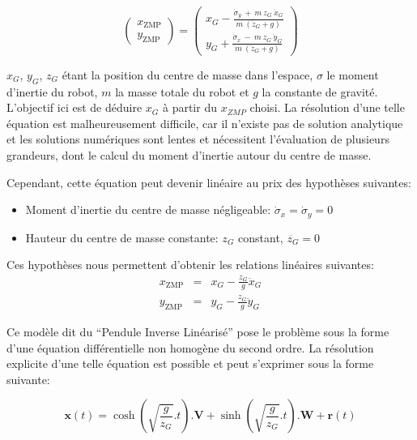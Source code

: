 \begin{equation}
\left(
\begin{array}{cc}
x_{\text{ZMP}}\\
y_{\text{ZMP}}
\end{array}
\right) = \left(
\begin{array}{cc}
x_G - \frac{\dot{\sigma}_y\ +\ m\ z_G\ \ddot{x}_G}{m\ (\ddot{z}_G + g)}\\
y_G + \frac{\dot{\sigma}_x\ -\ m\ z_G\ \ddot{y}_G}{m\ (\ddot{z}_G + g)}
\end{array}
\right)
\end{equation}

$x_G$, $y_G$, $z_G$ étant la position du centre de masse dans
l'espace, $\sigma$ le moment d'inertie du robot, $m$ la
masse totale du robot et $g$ la constante de gravité. L'objectif ici
est de déduire $x_{G}$ à partir du $x_{ZMP}$ choisi. La résolution
d'une telle équation est malheureusement difficile, car il n'existe
pas de solution analytique et les solutions numériques sont lentes et
nécessitent l'évaluation de plusieurs grandeurs, dont le calcul du
moment d'inertie autour du centre de masse.

Cependant, cette équation peut devenir linéaire au prix des hypothèses
suivantes:
\begin{itemize}
\item Moment d'inertie du centre de masse négligeable: $\dot{\sigma}_x = \dot{\sigma}_y = 0$
\item Hauteur du centre de masse constante: $z_G$ constant, $\ddot{z_G} = 0$
\end{itemize}

Ces hypothèses nous permettent d'obtenir les relations linéaires suivantes:
\begin{eqnarray*}\label{eq:zmplin}
x_{\text{ZMP}} &=& x_G - \frac{z_G}{g} \ddot{x}_G\\
y_{\text{ZMP}} &=& y_G - \frac{z_G}{g} \ddot{y}_G
\end{eqnarray*}

Ce modèle dit du ``Pendule Inverse Linéarisé'' pose le problème sous la forme d'une équation
différentielle non homogène du second ordre. La résolution explicite
d'une telle équation est possible et peut s'exprimer sous la forme
suivante:

\begin{equation}
  \mathbf{x}(t) = \cosh(\sqrt{\frac{g}{z_G}}.t) . \mathbf{V} + \sinh(\sqrt{\frac{g}{z_G}}.t) . \mathbf{W} + \mathbf{r}(t)
\end{equation}

